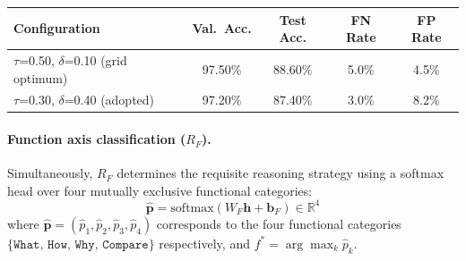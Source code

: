 \documentclass[a4paper,fleql]{cas-sc}
\begin{document}
\vspace{4pt}
\begin{center}
\begingroup
\renewcommand{\arraystretch}{1.2}
\label{tab:cross_fn_main}
\begin{tabular}{lcccc}
\toprule
\textbf{Configuration} & \textbf{Val.\ Acc.} & \textbf{Test Acc.} & \textbf{FN Rate} & \textbf{FP Rate} \\
\midrule
$\tau$=0.50, $\delta$=0.10 (grid optimum) & 97.50\% & 88.60\% & 5.0\% & 4.5\% \\
$\tau$=0.30, $\delta$=0.40 (adopted)      & 97.20\% & 87.40\% & 3.0\% & 8.2\% \\
\bottomrule
\end{tabular}
\endgroup
\end{center}
\vspace{4pt}

\paragraph{Function axis classification ($R_F$).}
Simultaneously, $R_F$ determines the requisite reasoning strategy using a
softmax head over four mutually exclusive functional categories:
\begin{equation}
    \hat{\mathbf{p}} = \text{softmax}(W_F \mathbf{h} + \mathbf{b}_F)
    \in \mathbb{R}^4
    \label{eq:func}
\end{equation}
where $\hat{\mathbf{p}} = (\hat{p}_1, \hat{p}_2, \hat{p}_3, \hat{p}_4)$
corresponds to the four functional categories
$\{\texttt{What},\, \texttt{How},\, \texttt{Why},\, \texttt{Compare}\}$
respectively, and $f^* = \arg\max_k \hat{p}_k$.
\end{document}
